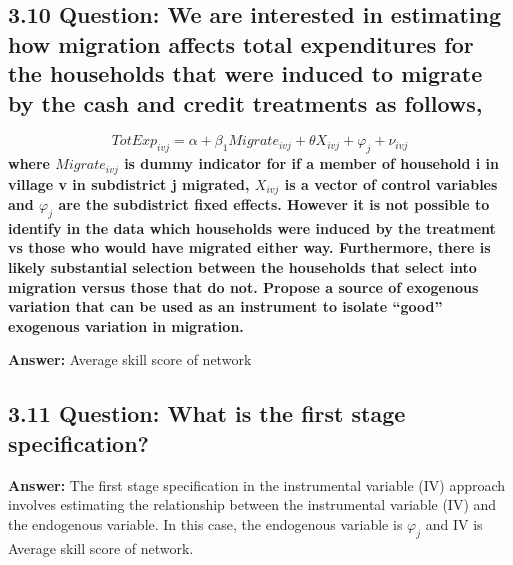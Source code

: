 \documentclass[
]{article}
\begin{document}
\clearpage

\hypertarget{question-we-are-interested-in-estimating-how-migration-affects-total-expenditures-for-the-households-that-were-induced-to-migrate-by-the-cash-and-credit-treatments-as-follows}{%
\subsection{\texorpdfstring{3.10 \textbf{Question: We are interested in
estimating how migration affects total expenditures for the households
that were induced to migrate by the cash and credit treatments as
follows,}}{3.10 Question: We are interested in estimating how migration affects total expenditures for the households that were induced to migrate by the cash and credit treatments as follows,}}\label{question-we-are-interested-in-estimating-how-migration-affects-total-expenditures-for-the-households-that-were-induced-to-migrate-by-the-cash-and-credit-treatments-as-follows}}

\[
TotExp_{ivj}=\alpha+\beta_1Migrate_{ivj}+\theta X_{ivj}+\varphi_j+\nu_{ivj}
\] \textbf{where \(Migrate_{ivj}\) is dummy indicator for if a member of
household i in village v in subdistrict j migrated, \(X_{ivj}\) is a
vector of control variables and \(\varphi_j\) are the subdistrict fixed
effects. However it is not possible to identify in the data which
households were induced by the treatment vs those who would have
migrated either way. Furthermore, there is likely substantial selection
between the households that select into migration versus those that do
not. Propose a source of exogenous variation that can be used as an
instrument to isolate ``good'' exogenous variation in migration. }

\textbf{Answer:} Average skill score of network

\clearpage

\hypertarget{question-what-is-the-first-stage-specification}{%
\subsection{\texorpdfstring{3.11 \textbf{Question: What is the first
stage
specification?}}{3.11 Question: What is the first stage specification?}}\label{question-what-is-the-first-stage-specification}}

\textbf{Answer:} The first stage specification in the instrumental
variable (IV) approach involves estimating the relationship between the
instrumental variable (IV) and the endogenous variable. In this case,
the endogenous variable is \(\varphi_j\) and IV is Average skill score
of network.
\end{document}
